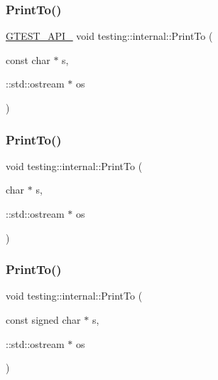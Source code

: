 \mbox{\label{namespacetesting_1_1internal_ac226053b96d7d61f9407e3b75bab07d9}} 
\subsubsection{\texorpdfstring{PrintTo()}{PrintTo()}\hspace{0.1cm}{\footnotesize\ttfamily [10/23]}}
{\footnotesize\ttfamily \mbox{\hyperlink{_obj__test_2lib_2googletest-release-1_88_81_2googletest_2include_2gtest_2internal_2gtest-port_8h_aa73be6f0ba4a7456180a94904ce17790}{G\+T\+E\+S\+T\+\_\+\+A\+P\+I\+\_\+}} void testing\+::internal\+::\+Print\+To (\begin{DoxyParamCaption}\item[{const char $\ast$}]{s,  }\item[{\+::std\+::ostream $\ast$}]{os }\end{DoxyParamCaption})}

\mbox{\label{namespacetesting_1_1internal_a553eec7bb50de01c9e91cac4accc606f}} 
\subsubsection{\texorpdfstring{PrintTo()}{PrintTo()}\hspace{0.1cm}{\footnotesize\ttfamily [11/23]}}
{\footnotesize\ttfamily void testing\+::internal\+::\+Print\+To (\begin{DoxyParamCaption}\item[{char $\ast$}]{s,  }\item[{\+::std\+::ostream $\ast$}]{os }\end{DoxyParamCaption})\hspace{0.3cm}{\ttfamily [inline]}}

\mbox{\label{namespacetesting_1_1internal_a792cc5665a34619ed7a6d54711433456}} 
\subsubsection{\texorpdfstring{PrintTo()}{PrintTo()}\hspace{0.1cm}{\footnotesize\ttfamily [12/23]}}
{\footnotesize\ttfamily void testing\+::internal\+::\+Print\+To (\begin{DoxyParamCaption}\item[{const signed char $\ast$}]{s,  }\item[{\+::std\+::ostream $\ast$}]{os }\end{DoxyParamCaption})\hspace{0.3cm}{\ttfamily [inline]}}

